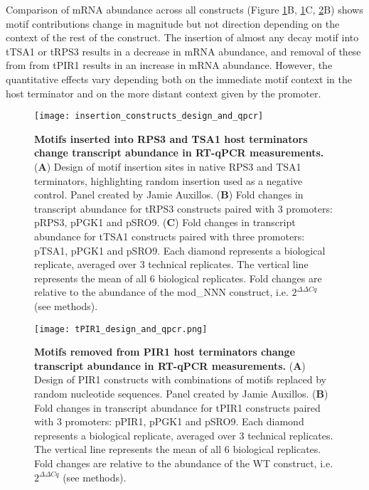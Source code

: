 \documentclass[../main.tex]{subfiles}
\begin{document}
Comparison of mRNA abundance across all constructs (Figure \ref{fig:tRPS3-tTSA1-design-and-qpcr}B, \ref{fig:tRPS3-tTSA1-design-and-qpcr}C, \ref{fig:tPIR1-design-and-qpcr}B) shows motif contributions change in magnitude but not direction depending on the context of the rest of the construct.
The insertion of almost any decay motif into tTSA1 or tRPS3 results in a decrease in mRNA abundance, and removal of these from from tPIR1 results in an increase in mRNA abundance.
However, the quantitative effects vary depending both on the immediate motif context in the host terminator and on the more distant context given by the promoter.

\begin{figure}[p]

{\centering \texttt{[image: insertion\_constructs\_design\_and\_qpcr]} 

}

\caption[Motifs inserted into RPS3 and TSA1 host terminators change transcript abundance in RT-qPCR measurements.]{\textbf{Motifs inserted into RPS3 and TSA1 host terminators change transcript abundance in RT-qPCR measurements.} (\textbf{A}) Design of motif insertion sites in native RPS3 and TSA1 terminators, highlighting random insertion used as a negative control. Panel created by Jamie Auxillos. (\textbf{B}) Fold changes in transcript abundance for tRPS3 constructs paired with 3 promoters: pRPS3, pPGK1 and pSRO9. (\textbf{C}) Fold changes in transcript abundance for tTSA1 constructs paired with three promoters: pTSA1, pPGK1 and pSRO9. Each diamond represents a biological replicate, averaged over 3 technical replicates. The vertical line represents the mean of all 6 biological replicates. Fold changes are relative to the abundance of the mod\_NNN construct, i.e. $2^{\Delta\Delta Cq}$ (see methods).}\label{fig:tRPS3-tTSA1-design-and-qpcr}
\end{figure}

\begin{figure}[p]

{\centering \texttt{[image: tPIR1\_design\_and\_qpcr.png]} 

}

\caption[Motifs removed from PIR1 host terminators change transcript abundance in RT-qPCR measurements.]{\textbf{Motifs removed from PIR1 host terminators change transcript abundance in RT-qPCR measurements.} (\textbf{A}) Design of PIR1 constructs with combinations of motifs replaced by random nucleotide sequences. Panel created by Jamie Auxillos. (\textbf{B}) Fold changes in transcript abundance for tPIR1 constructs paired with 3 promoters: pPIR1, pPGK1 and pSRO9. Each diamond represents a biological replicate, averaged over 3 technical replicates. The vertical line represents the mean of all 6 biological replicates. Fold changes are relative to the abundance of the WT construct, i.e. $2^{\Delta\Delta Cq}$ (see methods).}\label{fig:tPIR1-design-and-qpcr}
\end{figure}
\end{document}
